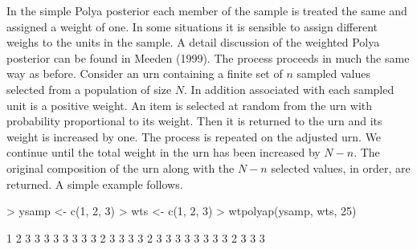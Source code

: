 \documentclass{article}
\begin{document}
In the simple 
Polya posterior each member of the sample is treated the same and 
assigned a weight of one. In some situations it is sensible to assign 
different weighs to the units in the sample. A detail discussion of 
the weighted Polya posterior can be found in Meeden (1999). \nocite{mee99} 
The process proceeds 
in much the same way as before. Consider an urn containing
  a finite set of $n$ sampled values 
selected from a population of size $N$.
  In addition associated with each sampled unit is a positive weight.
  An item is selected at random from the urn with probability
  proportional to its weight. Then it is returned to the urn and its
  weight is increased by one. The process is repeated on the
  adjusted urn. We continue until the total weight in the urn has
  been increased by $N-n$.
  The original composition of the urn along with the $N-n$ selected
  values, in order, are returned. A simple example follows.

\begin{Schunk}
\begin{Sinput}
> ysamp <- c(1, 2, 3)
> wts <- c(1, 2, 3)
> wtpolyap(ysamp, wts, 25)
\end{Sinput}
\begin{Soutput}
 [1] 1 2 3 3 3 3 3 3 3 3 2 3 3 3 3 2 3 3 3 3 3 3 3 3 2 3 3 3
\end{Soutput}
\end{Schunk}



\end{document}

